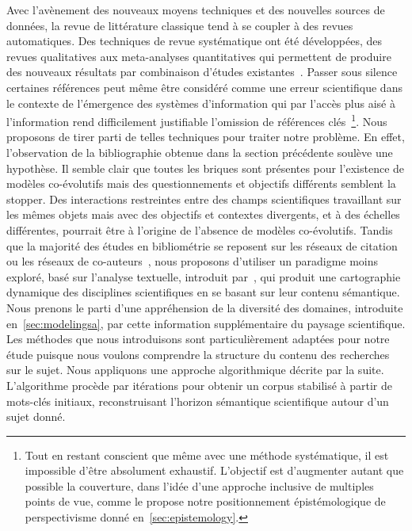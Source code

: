 {Avec l'avènement des nouveaux moyens techniques et des nouvelles sources de données, la revue de littérature classique tend à se coupler à des revues automatiques. Des techniques de revue systématique ont été développées, des revues qualitatives aux meta-analyses quantitatives qui permettent de produire des nouveaux résultats par combinaison d'études existantes~\cite{rucker2012network}. Passer sous silence certaines références peut même être considéré comme une erreur scientifique dans le contexte de l'émergence des systèmes d'information qui par l'accès plus aisé à l'information rend difficilement justifiable l'omission de références clés~\cite{lissacksubliminal}\footnote{Tout en restant conscient que même avec une méthode systématique, il est impossible d'être absolument exhaustif. L'objectif est d'augmenter autant que possible la couverture, dans l'idée d'une approche inclusive de multiples points de vue, comme le propose notre positionnement épistémologique de perspectivisme donné en~\ref{sec:epistemology}.}. Nous proposons de tirer parti de telles techniques pour traiter notre problème. En effet, l'observation de la bibliographie obtenue dans la section précédente soulève une hypothèse. Il semble clair que toutes les briques sont présentes pour l'existence de modèles co-évolutifs mais des questionnements et objectifs différents semblent la stopper. Des interactions restreintes entre des champs scientifiques travaillant sur les mêmes objets mais avec des objectifs et contextes divergents, et à des échelles différentes, pourrait être à l'origine de l'absence de modèles co-évolutifs. Tandis que la majorité des études en bibliométrie se reposent sur les réseaux de citation~\cite{2013arXiv1310.8220N} ou les réseaux de co-auteurs~\cite{2014arXiv1402.7268S}, nous proposons d'utiliser un paradigme moins exploré, basé sur l'analyse textuelle, introduit par~\cite{chavalarias2013phylomemetic}, qui produit une cartographie dynamique des disciplines scientifiques en se basant sur leur contenu sémantique. Nous prenons le parti d'une appréhension de la diversité des domaines, introduite en~\ref{sec:modelingsa}, par cette information supplémentaire du paysage scientifique. Les méthodes que nous introduisons sont particulièrement adaptées pour notre étude puisque nous voulons comprendre la structure du contenu des recherches sur le sujet. Nous appliquons une approche algorithmique décrite par la suite. L'algorithme procède par itérations pour obtenir un corpus stabilisé à partir de mots-clés initiaux, reconstruisant l'horizon sémantique scientifique autour d'un sujet donné.
}

